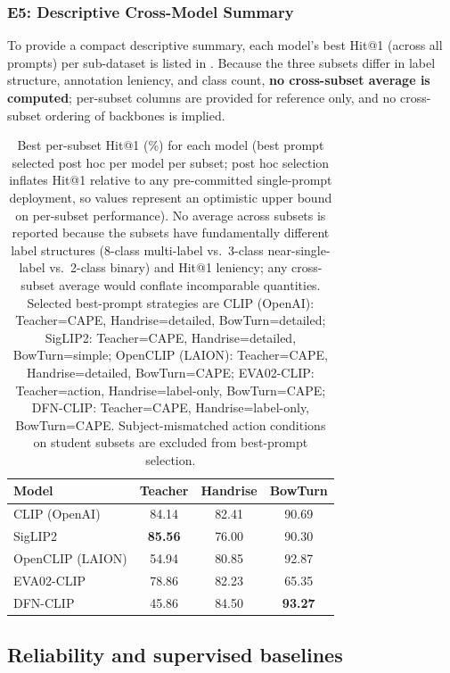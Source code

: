 \documentclass[symmetry,article,submit,pdftex,moreauthors]{Definitions/mdpi}
\begin{document}
\subsubsection{E5: Descriptive Cross-Model Summary}
\label{sec:e5}

To provide a compact descriptive summary, each model's best Hit@1 (across all prompts) per sub-dataset is listed in . Because the three subsets differ in label structure, annotation leniency, and class count, \textbf{no cross-subset average is computed}; per-subset columns are provided for reference only, and no cross-subset ordering of backbones is implied.

\begin{table}[H]
\caption{Best per-subset Hit@1 (\%) for each model (best prompt selected post hoc per model per subset; post hoc selection inflates Hit@1 relative to any pre-committed single-prompt deployment, so values represent an optimistic upper bound on per-subset performance). No average across subsets is reported because the subsets have fundamentally different label structures (8-class multi-label vs.\ 3-class near-single-label vs.\ 2-class binary) and Hit@1 leniency; any cross-subset average would conflate incomparable quantities. Selected best-prompt strategies are CLIP (OpenAI): Teacher=CAPE, Handrise=detailed, BowTurn=detailed; SigLIP2: Teacher=CAPE, Handrise=detailed, BowTurn=simple; OpenCLIP (LAION): Teacher=CAPE, Handrise=detailed, BowTurn=CAPE; EVA02-CLIP: Teacher=action, Handrise=label-only, BowTurn=CAPE; DFN-CLIP: Teacher=CAPE, Handrise=label-only, BowTurn=CAPE. Subject-mismatched action conditions on student subsets are excluded from best-prompt selection.}
\label{tab:model_ranking}
\centering
\begin{tabular}{lccc}
\toprule
\textbf{Model} & \textbf{Teacher} & \textbf{Handrise} & \textbf{BowTurn} \\
\midrule
CLIP (OpenAI) & 84.14 & 82.41 & 90.69 \\
SigLIP2 & \textbf{85.56} & 76.00 & 90.30 \\
OpenCLIP (LAION) & 54.94 & 80.85 & 92.87 \\
EVA02-CLIP & 78.86 & 82.23 & 65.35 \\
DFN-CLIP & 45.86 & 84.50 & \textbf{93.27} \\
\bottomrule
\end{tabular}
\end{table}

\subsection{Reliability and supervised baselines}
\end{document}
